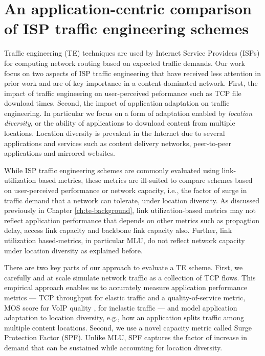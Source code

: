 \chapter{An application-centric comparison of ISP traffic engineering schemes}
\label{ch:beyondmlu}

Traffic engineering (TE) techniques are used by Internet Service Providers (ISPs) for computing network routing based on expected traffic demands. Our work focus on two aspects of ISP traffic engineering that have received less attention in prior work and are of key importance in a content-dominated network. First, the impact of traffic engineering on user-perceived peformance such as TCP file download times. Second, the impact of application adaptation on traffic engineering. In particular we focus on a form of adaptation enabled by \emph{location diversity}, or the ability of applications to download content from multiple locations. Location diversity is prevalent in the Internet due to several applications and services such as content delivery networks, peer-to-peer applications and mirrored websites.

While ISP traffic engineering schemes are commonly evaluated using link-utilization based metrics, these metrics are ill-suited to compare schemes based on user-perceived performance or network capacity, i.e., the factor of surge in traffic demand that a network can tolerate, under location diversity. As discussed previously in Chapter \ref{ch:te-background}, link utilization-based metrics may not reflect application performance that depends on other metrics such as propagtion delay, access link capacity and backbone link capacity also. Further, link utilization based-metrics, in particular MLU, do not reflect network capacity under location diversity as explained before. 

There are two key parts of our approach to evaluate a TE scheme. First, we carefully and at scale simulate network traffic as a collection of TCP flows. This empirical approach  enables us to accurately measure application performance metrics --- TCP throughput for elastic traffic and a quality-of-service metric,  MOS score for VoIP quality \cite{MOS-formula}, for inelastic traffic --- and model application adaptation to location diversity, e.g., how an application splits traffic among multiple content locations. Second, we use a novel capacity metric called Surge Protection Factor (SPF). Unlike MLU, SPF captures the factor of increase in demand that can be sustained while accounting for location diversity. 

